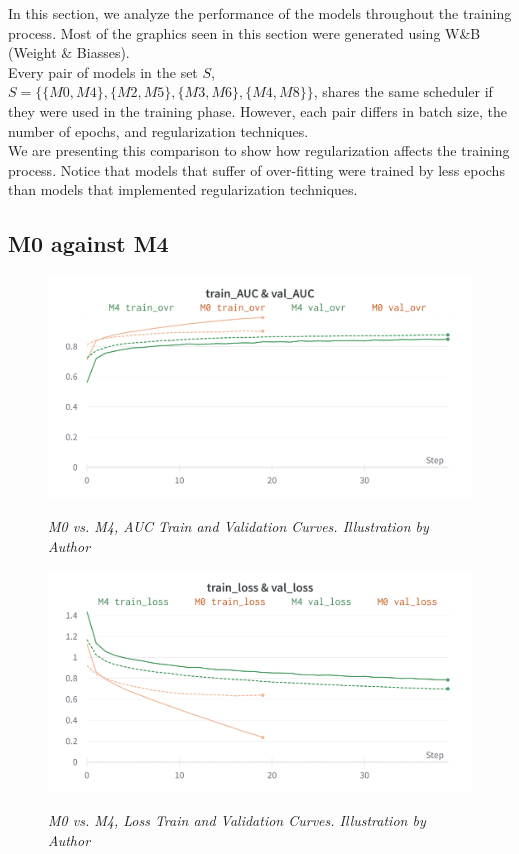 In this section, we analyze the performance of the models throughout the training process.
Most of the graphics seen in this section were generated using W\&B (Weight \& Biasses).\\


Every pair of models in the set \(S\), \(S=\{\{M0, M4\}, \{M2, M5\}, \{M3, M6\}, \{M4, M8\}\}\),
shares the same scheduler if they were used in the training phase.
However, each pair differs in batch size, the number of epochs, and regularization techniques. \\

We are presenting this comparison to show how regularization affects the training process. Notice that models that suffer of over-fitting were trained by less epochs than models
that implemented regularization techniques.

\subsection{M0 against M4}

\begin{figure}[H]
\centering
    \includegraphics[width=\textwidth]{imatges/results/AUCM0M4.png}
\caption[M0 vs. M4, AUC Train and Validation Curves]{\textit{M0 vs. M4, AUC Train and Validation Curves. Illustration by Author}}
{\label{fig:aucm0m4}}
\end{figure}

\newpage

\begin{figure}[H]
\centering
    \includegraphics[width=\textwidth]{imatges/results/LossM0M4.png}
\caption[M0 vs. M4, Loss Train and Validation Curves]{\textit{M0 vs. M4, Loss Train and Validation Curves. Illustration by Author}}
{\label{fig:lossm0m4}}
\end{figure}

